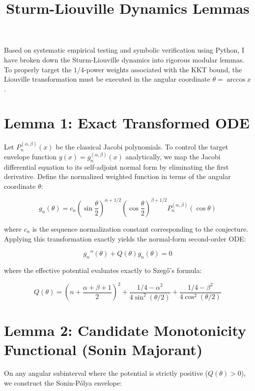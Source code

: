 \documentclass[11pt]{article}
\title{Sturm-Liouville Dynamics Lemmas}
\author{}
\date{}
\begin{document}
\maketitle
Based on systematic empirical testing and symbolic verification using Python, I have broken down the Sturm-Liouville dynamics into rigorous modular lemmas. To properly target the \(1/4\)-power weights associated with the KKT bound, the Liouville transformation must be executed in the angular coordinate \(\theta = \arccos x\).

\section*{Lemma 1: Exact Transformed ODE}

Let \(P_n^{(\alpha,\beta)}(x)\) be the classical Jacobi polynomials. To control the target envelope function \(y(x) = g_n^{(\alpha,\beta)}(x)\) analytically, we map the Jacobi differential equation to its self-adjoint normal form by eliminating the first derivative.
Define the normalized weighted function in terms of the angular coordinate \(\theta\):


\begin{equation*}
g_n(\theta) = c_n \left(\sin\frac{\theta}{2}\right)^{\alpha+1/2} \left(\cos\frac{\theta}{2}\right)^{\beta+1/2} P_n^{(\alpha,\beta)}(\cos\theta)
\end{equation*}


where \(c_n\) is the sequence normalization constant corresponding to the conjecture. Applying this transformation exactly yields the normal-form second-order ODE:


\begin{equation*}
g_n''(\theta) + Q(\theta) g_n(\theta) = 0
\end{equation*}


where the effective potential evaluates exactly to Szegő's formula:


\begin{equation*}
Q(\theta) = \left( n + \frac{\alpha+\beta+1}{2} \right)^2 + \frac{1/4 - \alpha^2}{4 \sin^2(\theta/2)} + \frac{1/4 - \beta^2}{4 \cos^2(\theta/2)}
\end{equation*}

\section*{Lemma 2: Candidate Monotonicity Functional (Sonin Majorant)}

On any angular subinterval where the potential is strictly positive (\(Q(\theta) > 0\)), we construct the Sonin-Pólya envelope:
\end{document}
